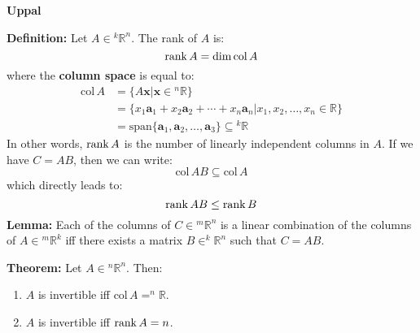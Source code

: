 \documentclass{article}
\newcommand{\bff}[1]{\mathbf{#1}}
\newcommand{\spann}[1]{\mathrm{span}\{#1\}}
\newcommand{\col}[1]{\mathrm{col}\,#1}
\begin{document}
    \begin{minipage}[t]{.45\textwidth} %
        \begin{center}
            \textbf{Uppal}
        \end{center}
        \textbf{Definition:} Let $A \in {^k}\mathbb{R}^n$. The rank of $A$ is:
        \begin{equation*}
            \rank A = \dim \col A
        \end{equation*}
        where the \textbf{column space} is equal to:
        \begin{align*}
            \col A &= \{A\bff{x} | \bff{x} \in {^n}\mathbb{R}\} \\
                   &= \{x_1\bff{a}_1 + x_2\bff{a}_2 + \cdots + x_n\bff{a}_n | x_1,x_2,\dots,x_n \in \mathbb{R}\} \\
                   &= \spann{\bff{a}_1,\bff{a}_2,\dots,\bff{a}_3}  \subseteq {^k}\mathbb{R}
        \end{align*}
        In other words, $\rank A$ is the number of linearly independent columns in $A$. If we have $C=AB$, then we can write:
        \begin{equation*}
            \col AB \subseteq \col A
        \end{equation*}
        which directly leads to:
        \begin{equation*}
            \rank AB \le \rank B
        \end{equation*}
        \textbf{Lemma:} Each of the columns of $C \in {^m}\mathbb{R}^n$ is a linear combination of the columns of $A \in {^m}\mathbb{R}^k$ iff there exists a matrix $B \in ^k\mathbb{R}^n$ such that $C=AB$.
        \vspace{2mm}

        \textbf{Theorem:} Let $A \in {^n}\mathbb{R}^n$. Then:
        \begin{enumerate}
            \item $A$ is invertible iff $\col A = ^n\mathbb{R}$.
            \item $A$ is invertible iff $\rank A = n$.
        \end{enumerate}
        \vspace{2mm}


\end{minipage}
\end{document}
